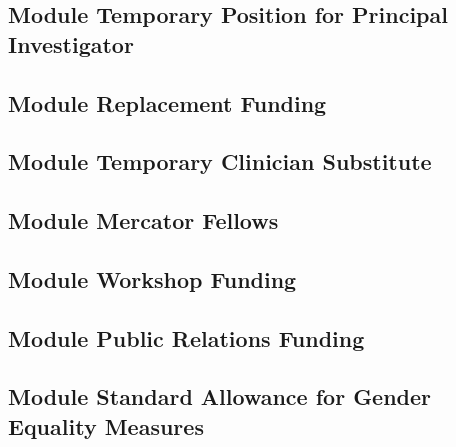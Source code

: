 \documentclass{scrartcl}
\begin{document}

\subsection{Module Temporary Position for Principal Investigator}

\subsection{Module Replacement Funding}

\subsection{Module Temporary Clinician Substitute}

\subsection{Module Mercator Fellows}

\subsection{Module Workshop Funding}

\subsection{Module Public Relations Funding}

\subsection{Module Standard Allowance for Gender Equality Measures}
\end{document}
